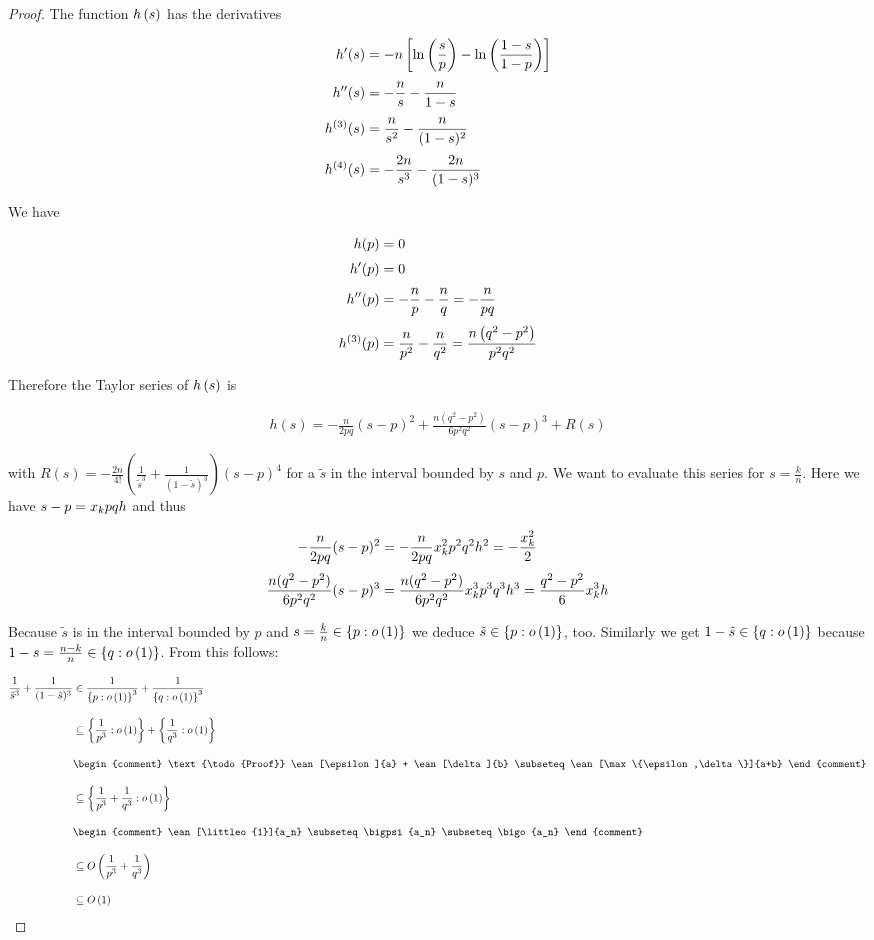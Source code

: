 \begin{proof}
  \noindent The function $\h{s}$ has the derivatives

  \begin{align}
    h'(s) &= -n\left[\ln\left(\frac sp\right) - \ln\left(\frac{1-s}{1-p}\right)\right] \nl
    h''(s) &= -\frac ns - \frac n{1-s} \nl
    h^{(3)}(s) &= \frac n{s^2} - \frac n{(1-s)^2} \nl
    h^{(4)}(s) &= -\frac {2n}{s^3} - \frac {2n}{(1-s)^3}
  \end{align}

  \noindent We have

  \begin{align}
    h(p)& = 0 \nl
    h'(p)& =0 \nl
    h''(p) & = -\frac np - \frac nq = -\frac n{pq} \nl
    h^{(3)}(p) &= \frac n{p^2}-\frac{n}{q^2} = \frac{n\left(q^2-p^2\right)}{p^2q^2}
  \end{align}

  \noindent Therefore the Taylor series of $\h{s}$ is

  \begin{align}
    h(s) = -\frac{n}{2pq} (s-p)^2 + \frac{n(q^2-p^2)}{6p^2q^2} (s-p)^3 + R(s)
  \end{align}

  with $R(s)=-\frac{2n}{4!} \left(\frac{1}{\tilde s^3}+\frac{1}{(1-\tilde s)^3}\right) (s-p)^4$ for a $\tilde s$ in the interval bounded by $s$ and $p$. We want to evaluate this series for $s=\frac kn$. Here we have $s-p=\x pqh$ and thus

  \begin{align}
    -\frac{n}{2pq} (s-p)^2 &= -\frac{n}{2pq} \x^2 p^2 q^2 h^2 = -\frac{\x^2}{2} \nl
    \frac{n(q^2-p^2)}{6p^2q^2} (s-p)^3 &= \frac{n(q^2-p^2)}{6p^2q^2} \x^3p^3q^3h^3 = \frac{q^2-p^2}{6} \x^3 h
  \end{align}


  Because $\tilde s$ is in the interval bounded by $p$ and $s=\frac kn \in \ean[\littleo{1}]{p}$ we deduce $\tilde s \in \ean[\littleo{1}]{p}$, too. Similarly we get $1-\tilde s\in\ean[\littleo{1}]{q}$ because $1-s = \frac{n-k}{n} \in \ean[\littleo{1}]{q}$. From this follows:

  \begin{align}
    \frac 1{\tilde s^3} + \frac 1{(1-\tilde s)^3} & \in \frac 1{\ean[\littleo{1}]{p}^3} + \frac 1{\ean[\littleo{1}]{q}^3} \bnl
    & \subseteq \ean[\littleo{1}]{\frac 1{p^3}} + \ean[\littleo{1}]{\frac 1{q^3}} \bnl
    &
    \begin{comment}
      \text{\todo{Proof}} \ean[\epsilon]{a} + \ean[\delta]{b} \subseteq \ean[\max\{\epsilon,\delta\}]{a+b}
    \end{comment} \bnl
    & \subseteq \ean[\littleo{1}]{\frac 1{p^3} + \frac 1{q^3}} \bnl
    &
    \begin{comment}
      \ean[\littleo{1}]{a_n} \subseteq \bigpsi{a_n} \subseteq \bigo{a_n}
    \end{comment} \bnl
    & \subseteq \bigo{\frac 1{p^3} + \frac 1{q^3}} \bnl
    & \subseteq \bigo{1}
  \end{align}


\end{proof}
